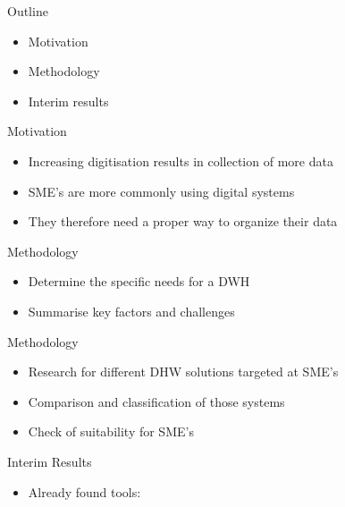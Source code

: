 \documentclass[aspectratio=169]{beamer}
\begin{document}
  \maketitle

  \begin{frame}{Outline}
    \begin{itemize}
      \item Motivation
      \item Methodology
      \item Interim results
    \end{itemize}
  \end{frame}

  \begin{frame}{Motivation}
    \begin{itemize}
      \item Increasing digitisation results in collection of more data
      \item SME's are more commonly using digital systems
      \item They therefore need a proper way to organize their data
    \end{itemize}
  \end{frame}

  \begin{frame}{Methodology}
    \begin{itemize}
      \item Determine the specific needs for a DWH
      \item Summarise key factors and challenges
    \end{itemize}
  \end{frame}

  \begin{frame}{Methodology}
    \begin{itemize}
      \item Research for different DHW solutions targeted at SME's
      \item Comparison and classification of those systems
      \item Check of suitability for SME's
    \end{itemize}
  \end{frame}

  \begin{frame}{Interim Results}
    \begin{itemize}
      \item Already found tools:
    \end{itemize}
  \end{frame}
\end{document}
